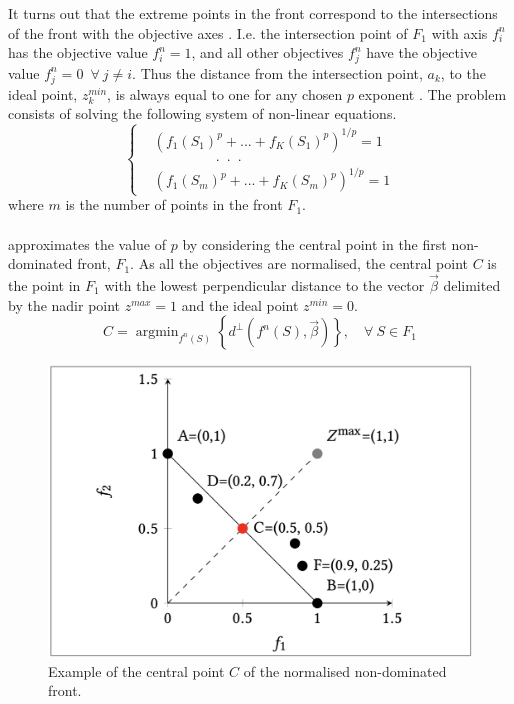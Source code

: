 \documentclass[mscthesis, 11pt]{usiinfthesis}
\DeclareMathOperator*{\argmin}{argmin}
\theoremstyle{newdefinition}
\begin{document}
It turns out that the extreme points in the front correspond to the intersections of the front with the objective axes \cite[~p.~598]{panichella_adaptive_2019}. I.e. the intersection point of $F_1$ with axis $f_i ^n$ has the objective value $f_i^n = 1$, and all other objectives $f_j^n$ have the objective value $f_j^n = 0 \enspace \forall \: j \neq i$.  Thus the distance from the intersection point, $a_k$, to the ideal point, $z^{min}_k$, is always equal to one for any chosen $p$ exponent \cite[~p.~598]{panichella_adaptive_2019}.
The problem consists of solving the following system of non-linear equations.
\begin{equation}
    \left\{
    \begin{aligned}
      & \left(f_1(S_1)^p + ... + f_K(S_1)^p\right)^{1/p} = 1 \\
      & \qquad \qquad \: \: . \enspace . \enspace . \\
      & \left(f_1(S_m)^p + ... + f_K(S_m)^p\right)^{1/p} = 1 
    \end{aligned}
  \right.
\end{equation}
where $m$ is the number of points in the front $F_1$.
\\\\
\cite{panichella_adaptive_2019} approximates the value of $p$ by considering the central point in the first non-dominated front, $F_1$. As all the objectives are normalised, the central point $C$ is the point in $F_1$ with the lowest perpendicular distance to the vector $\vec{\beta}$ delimited by the nadir point $z^{max} = 1$ and the ideal point $z^{min} = 0$.
\begin{equation}
    C = \argmin_{f^n (S)} \left\{ d^{\perp}(f^n (S), \vec{\beta}) \right\}, \quad \forall \: S \in F_1
\end{equation}
\begin{figure}[ht]
    \centering
    \includegraphics[scale=0.5]{literature_review/central_point.png}
    \caption{Example of the central point $C$ of the normalised non-dominated front.}
    \label{fig:central_point}
\end{figure}
\end{document}
